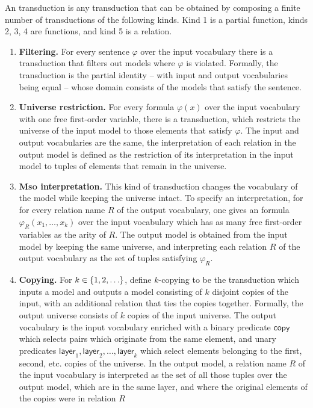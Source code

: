 \begin{definition}\label{def:mso-transduction}
    An \mso transduction is any transduction that can be obtained by composing a finite number of transductions of the following kinds.
Kind 1 is a partial function, kinds 2, 3, 4 are functions, and kind 5 is a relation.
\begin{enumerate}
	\item {\bf Filtering.} For every \mso sentence $\varphi$ over the input vocabulary there is a transduction that filters out models where $\varphi$ is violated. Formally, the transduction is the partial identity -- with input and output vocabularies being equal --  whose domain consists of the models that satisfy the sentence. 
	\item {\bf Universe restriction.} For every \mso formula $\varphi(x)$ over the input vocabulary with one free first-order variable, there is a transduction, which restricts the universe of the input model to those elements that satisfy $\varphi$. The input and output vocabularies are the same, the interpretation of each relation in the output model is defined as the restriction of its interpretation 
	in the input model to tuples of elements that remain in the universe.
	\item {\bfseries{\scshape{Mso}} interpretation.} This kind of transduction changes the vocabulary of the model while keeping the universe intact. To specify an \mso interpretation, for for every relation name $R$ of the output vocabulary, one gives an \mso formula $\varphi_R(x_1,\ldots,x_k)$ over the input vocabulary which has as many free first-order variables as the arity of $R$. The output model is obtained from the input model by keeping the same universe, and interpreting each relation $R$ of the output vocabulary as the set of tuples  satisfying $\varphi_R$.
	\item {\bf Copying.} For  $k \in \{1,2,\ldots\}$, define $k$-copying to be the transduction which inputs a model and outputs a model consisting of $k$ disjoint copies of the input, with an additional relation that ties the copies together. Formally, the output universe consists of $k$ copies of the input universe.
	The output vocabulary is the input vocabulary enriched with a binary predicate $\mathsf{copy}$ which selects pairs which originate from the same element, and unary predicates $\mathsf{layer}_1,\mathsf{layer}_2,\ldots,\mathsf{layer}_k$ which select elements belonging to the first, second, etc. copies of the universe.
	In the output model, a relation name $R$ of the input vocabulary is interpreted as the set of all those tuples over the output model, which are in the same layer, and  where the original elements of the copies were in relation $R$

\end{enumerate}
\end{definition}
